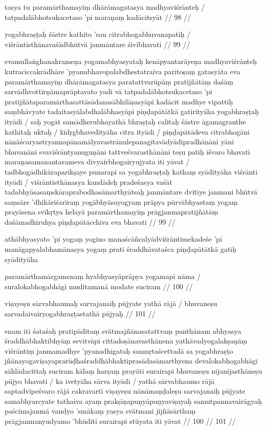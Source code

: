 tasya tu paramārthamayīṃ dhārāmagatasya madhyaviśrānteḥ  /
tatpadalābhotsukacetaso 'pi maraṇaṃ kadācitsyāt  // 98  //

yogabhraṣṭaḥ śāstre kathito 'sau citrabhogabhuvanapatiḥ  /
viśrāntisthānavaśādbhūtvā janmāntare śivībhavati  // 99  //

evamullaṅghanakrameṇa yogamabhyasyataḥ kenāpyantarāyeṇa madhyaviśrānteḥ kutraciccakrādhāre 'pyanubhavopalabdhestatraiva paritoṣaṃ gatasyāta eva paramārthamayīṃ dhārāmagatasya paratattvarūpāṃ pratijñātāṃ daśāṃ sarvādhvottīrṇāmaprāptavato yadi vā tatpadalābhotsukacetaso 'pi pratijñātaparamārthasattāsādanasābhilāṣasyāpi kadācit madhye vipattiḥ saṃbhāvyate tadaitasyālabdhalābhasyāpi piṇḍapātātkā gatirityāha yogabhraṣṭaḥ ityādi  / saḥ yogāt samādherubhayathā bhraṣṭaḥ calitaḥ śāstre āgamagranthe kathitaḥ uktaḥ  / kīdṛgbhavedityāha citra ityādi  / piṇḍapātādeva citrabhogāni nānāścaryastryannapānamālyavastrānulepanagītavādyādipradhānāni yāni bhuvanāni svaviśrāntyanuguṇāni tattveśvarasthānāni teṣu patiḥ īśvaro bhavati maraṇasamanantarameva divyairbhogairyujyata iti yāvat  / tadbhogādhikāraparikṣaye punarapi sa yogabhraṣṭaḥ kathaṃ syādityāha viśrānti ityādi  / viśrāntisthānasya kandādeḥ pradeśasya vaśāt tadabhyāsasaṃskāraprabodhasāmarthyātsaḥ janmāntare dvitīye janmani bhūtvā saṃsāre 'dhikāriśarīraṃ yogābhyāsayogyaṃ prāpya pūrvābhyastaṃ yogaṃ prayāsena svīkṛtya helayā paramārthamayīṃ prāgjanmapratijñātāṃ daśāmadhiruhya piṇḍapātācchiva eva bhavati  // 99  //

athābhyasyato 'pi yogaṃ yogino manaścāñcalyādviśrāntimekadeśe 'pi manāgapyalabhamānasya yogaṃ prati śraddhāvataśca piṇḍapātātkā gatiḥ syādityāha

paramārthamārgamenaṃ hyabhyasyāprāpya yogamapi nāma  /
suralokabhogabhāgī muditamanā modate suciram  // 100  //

viṣayeṣu sārvabhaumaḥ sarvajanaiḥ pūjyate yathā rājā  /
bhuvaneṣu sarvadaivairyogabhraṣṭastathā pūjyaḥ  // 101  //

enam iti śataśaḥ pratipāditaṃ svātmajñānasatattvaṃ panthānam abhyasya śraddhābhaktibhyāṃ sevitvāpi cittadoṣānavasthānena yathāvadyogalakṣaṇāṃ viśrāntiṃ janmamadhye 'pyanadhigataḥ sanmṛtaścettadā sa yogabhraṣṭo jñānayogaviṣayaprarūḍhaśraddhābhaktiprasādasāmarthyena devalokabhogabhāgī sāhlādacittaḥ suciram kālaṃ harṣaṃ prayāti surairapi bhuvaneṣu nijanijasthāneṣu pūjyo bhavati  / ka ivetyāha sārva ityādi  / yathā sārvabhaumo rājā saptadvīpeśvaro rājā cakravartī viṣayeṣu nānāmaṇḍaleṣu sarvajanaiḥ pūjyate samabhyarcyate tathaiva ayaṃ prakṣīṇapuṇyāpuṇyaviṣayaḥ samutpannavairāgyaḥ paścimajanmā vandyo 'smākaṃ yasya svātmani jijñāsārthaṃ prāgjanmanyudyamo 'bhūditi surairapi stūyata iti yāvat  // 100  // 101  //

